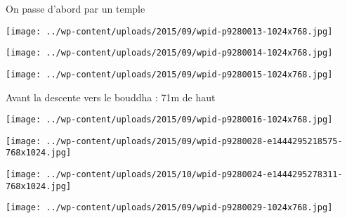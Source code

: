  On passe d'abord par un temple \newline
 \newline
\centerline{\texttt{[image: ../wp-content/uploads/2015/09/wpid-p9280013-1024x768.jpg]} } 
 \newline
 \newline
\centerline{\texttt{[image: ../wp-content/uploads/2015/09/wpid-p9280014-1024x768.jpg]} } 
 \newline
 \newline
\centerline{\texttt{[image: ../wp-content/uploads/2015/09/wpid-p9280015-1024x768.jpg]} } 
 \newline
 Avant la descente vers le bouddha : 71m de haut \newline
 \newline
\centerline{\texttt{[image: ../wp-content/uploads/2015/09/wpid-p9280016-1024x768.jpg]} } 
 \newline
 \newline
\centerline{\texttt{[image: ../wp-content/uploads/2015/09/wpid-p9280028-e1444295218575-768x1024.jpg]} } 
 \newline
 \newline
\centerline{\texttt{[image: ../wp-content/uploads/2015/10/wpid-p9280024-e1444295278311-768x1024.jpg]} } 
 \newline
 \newline
\centerline{\texttt{[image: ../wp-content/uploads/2015/09/wpid-p9280029-1024x768.jpg]} } 
 \newline

\newpage
 
